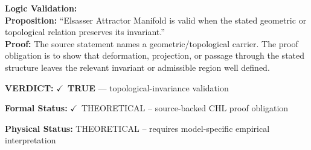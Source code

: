 \textbf{Logic Validation:}\\
\textbf{Proposition:} ``Elsasser Attractor Manifold is valid when the stated geometric or topological relation
preserves its invariant.''\\
\textbf{Proof:} The source statement names a geometric/topological carrier. The proof obligation is to
show that deformation, projection, or passage through the stated structure leaves the
relevant invariant or admissible region well defined.

\textbf{VERDICT:} \ensuremath{\checkmark}\ \textbf{TRUE} --- topological-invariance validation

\textbf{Formal Status:} \ensuremath{\checkmark}\ THEORETICAL -- source-backed CHL proof obligation

\textbf{Physical Status:} THEORETICAL -- requires model-specific empirical interpretation
\par\vspace{0.45em}
\par
\ifTZPDarkEdition
{}
\fi
\endgroup
\endgroup
